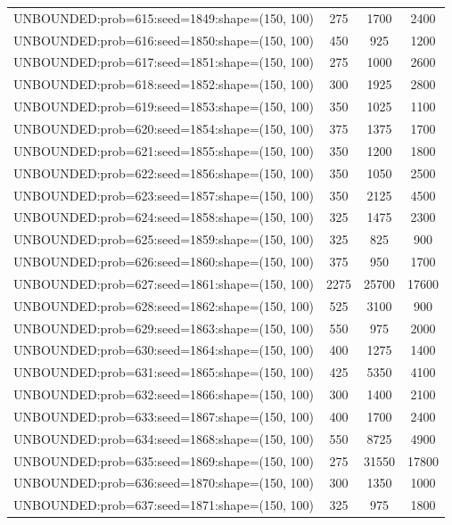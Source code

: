 \begin{longtable}{lccc}
UNBOUNDED:prob=615:seed=1849:shape=(150, 100) &      275 &  1700 &   2400 \\
UNBOUNDED:prob=616:seed=1850:shape=(150, 100) &      450 &   925 &   1200 \\
UNBOUNDED:prob=617:seed=1851:shape=(150, 100) &      275 &  1000 &   2600 \\
UNBOUNDED:prob=618:seed=1852:shape=(150, 100) &      300 &  1925 &   2800 \\
UNBOUNDED:prob=619:seed=1853:shape=(150, 100) &      350 &  1025 &   1100 \\
UNBOUNDED:prob=620:seed=1854:shape=(150, 100) &      375 &  1375 &   1700 \\
UNBOUNDED:prob=621:seed=1855:shape=(150, 100) &      350 &  1200 &   1800 \\
UNBOUNDED:prob=622:seed=1856:shape=(150, 100) &      350 &  1050 &   2500 \\
UNBOUNDED:prob=623:seed=1857:shape=(150, 100) &      350 &  2125 &   4500 \\
UNBOUNDED:prob=624:seed=1858:shape=(150, 100) &      325 &  1475 &   2300 \\
UNBOUNDED:prob=625:seed=1859:shape=(150, 100) &      325 &   825 &    900 \\
UNBOUNDED:prob=626:seed=1860:shape=(150, 100) &      375 &   950 &   1700 \\
UNBOUNDED:prob=627:seed=1861:shape=(150, 100) &     2275 & 25700 &  17600 \\
UNBOUNDED:prob=628:seed=1862:shape=(150, 100) &      525 &  3100 &    900 \\
UNBOUNDED:prob=629:seed=1863:shape=(150, 100) &      550 &   975 &   2000 \\
UNBOUNDED:prob=630:seed=1864:shape=(150, 100) &      400 &  1275 &   1400 \\
UNBOUNDED:prob=631:seed=1865:shape=(150, 100) &      425 &  5350 &   4100 \\
UNBOUNDED:prob=632:seed=1866:shape=(150, 100) &      300 &  1400 &   2100 \\
UNBOUNDED:prob=633:seed=1867:shape=(150, 100) &      400 &  1700 &   2400 \\
UNBOUNDED:prob=634:seed=1868:shape=(150, 100) &      550 &  8725 &   4900 \\
UNBOUNDED:prob=635:seed=1869:shape=(150, 100) &      275 & 31550 &  17800 \\
UNBOUNDED:prob=636:seed=1870:shape=(150, 100) &      300 &  1350 &   1000 \\
UNBOUNDED:prob=637:seed=1871:shape=(150, 100) &      325 &   975 &   1800 \\

\end{longtable}
